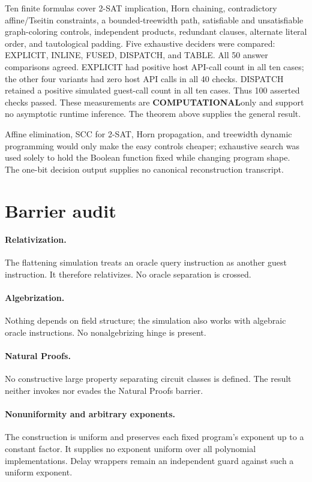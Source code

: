 \documentclass[11pt]{article}
\newcommand{\Comp}{\textbf{COMPUTATIONAL}}
\begin{document}
Ten finite formulas cover 2-SAT implication, Horn chaining, contradictory
affine/Tseitin constraints, a bounded-treewidth path, satisfiable and
unsatisfiable graph-coloring controls, independent products, redundant
clauses, alternate literal order, and tautological padding.  Five exhaustive
deciders were compared: EXPLICIT, INLINE, FUSED, DISPATCH, and TABLE.
All 50 answer comparisons agreed.  EXPLICIT had positive host API-call count in
all ten cases; the other four variants had zero host API calls in all 40 checks.
DISPATCH retained a positive simulated guest-call count in all ten cases.
Thus 100 asserted checks passed.  These measurements are \Comp only and support
no asymptotic runtime inference.  The theorem above supplies the general result.

Affine elimination, SCC for 2-SAT, Horn propagation, and treewidth dynamic
programming would only make the easy controls cheaper; exhaustive search was
used solely to hold the Boolean function fixed while changing program shape.
The one-bit decision output supplies no canonical reconstruction transcript.

\section{Barrier audit}
\paragraph{Relativization.}
The flattening simulation treats an oracle query instruction as another guest
instruction.  It therefore relativizes.  No oracle separation is crossed.

\paragraph{Algebrization.}
Nothing depends on field structure; the simulation also works with algebraic
oracle instructions.  No nonalgebrizing hinge is present.

\paragraph{Natural Proofs.}
No constructive large property separating circuit classes is defined.  The
result neither invokes nor evades the Natural Proofs barrier.

\paragraph{Nonuniformity and arbitrary exponents.}
The construction is uniform and preserves each fixed program's exponent up to
a constant factor.  It supplies no exponent uniform over all polynomial
implementations.  Delay wrappers remain an independent guard against such a
uniform exponent.
\end{document}
